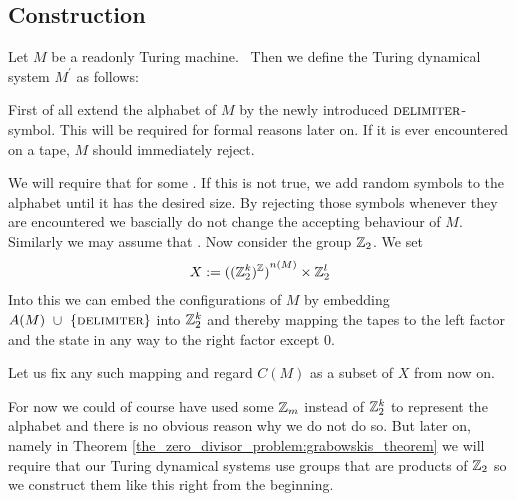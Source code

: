 \subsection{Construction}
\label{tm_to_tds:construction}

Let $M$ be a readonly Turing machine.\footnotemark~
Then we define the Turing dynamical system $M^\prime$ as follows:

First of all extend the alphabet of $M$ by the newly introduced $\text{\scshape{delimiter}}$-symbol. This will be required for formal reasons later on. If it is ever encountered on a tape, $M$ should immediately reject.

We will require that  for some .
If this is not true, we add random symbols to the alphabet until it has the desired size. By rejecting those symbols whenever they are encountered we bascially do not change the accepting behaviour of $M$.
Similarly we may assume that .
Now consider the group $\mathbb{Z}_2$.
We set
\begin{align*}
	X := {{((\mathbb{Z}_2^{k})^{\mathbb{Z}})}^{n(M)}} \times \mathbb{Z}_2^l
\end{align*}
Into this we can embed the configurations of $M$ by embedding $A(M)~\cup~\{\text{\scshape{delimiter}}\}$ into $\mathbb{Z}_2^k$ and thereby mapping the tapes to the left factor and the state in any way to the right factor except $0$.

Let us fix any such mapping and regard $C(M)$ as a subset of $X$ from now on.

\begin{Remark}
	For now we could of course have used some $\mathbb{Z}_m$ instead of $\mathbb{Z}_2^k$ to represent the alphabet and there is no obvious reason why we do not do so.
	But later on, namely in Theorem \ref{the_zero_divisor_problem:grabowskis_theorem} we will require that our Turing dynamical systems use groups that are products of $\mathbb{Z}_2$ so we construct them like this right from the beginning.
\end{Remark}

